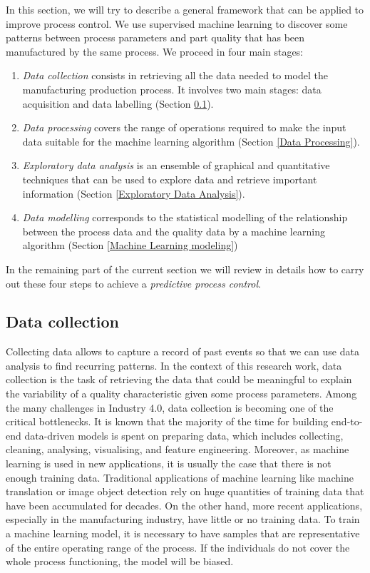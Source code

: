 In this section, we will try to describe a general framework that can be applied to improve process control. We use supervised machine learning to discover some patterns between process parameters and part quality that has been manufactured by the same process. We proceed in four main stages:
\begin{enumerate}
    \item \textit{Data collection} consists in retrieving all the data needed to model the manufacturing production process. It involves two main stages:  data acquisition and  data labelling (Section \ref{Data Collection}). 
    \item \textit{Data processing} covers the range of operations required to make the input data suitable for the machine learning algorithm (Section \ref{Data Processing}). 
    \item \textit{Exploratory data analysis} is an ensemble of graphical and quantitative techniques that can be used to explore data and retrieve important information (Section \ref{Exploratory Data Analysis}).
    \item \textit{Data modelling} corresponds to the statistical modelling of the relationship between the process data and the quality data by a machine learning algorithm (Section \ref{Machine Learning modeling})
\end{enumerate}

In the remaining part of the current section we will review in details how to carry out these four steps to achieve a \textit{predictive process control}. 

\subsection{Data collection} \label{Data Collection}

Collecting data allows to capture a record of past events so that we can use data analysis to find recurring patterns. In the context of this research work, data collection is the task of retrieving the data that could be meaningful to explain the variability of a quality characteristic given some process parameters. Among the many challenges in Industry 4.0, data collection is becoming one of the critical bottlenecks. It is known that the majority of the time for building end-to-end data-driven models is spent on preparing data, which includes collecting, cleaning, analysing, visualising, and feature engineering. Moreover, as machine learning is used in new applications, it is usually the case that there is not enough training data. Traditional applications of machine learning like machine translation or image object detection rely on huge quantities of training data that have been accumulated for decades. On the other hand, more recent applications, especially in the manufacturing industry, have little or no training data. To train a machine learning model, it is necessary to have samples that are representative of the entire operating range of the process. If the individuals do not cover the whole process functioning, the model will be biased.

